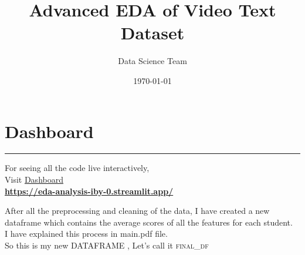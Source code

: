 \documentclass{article}
\title{\textcolor{primaryColor}{\Huge\textbf{Advanced EDA of Video Text Dataset}}}
\author{\textcolor{secondaryColor}{\Large Data Science Team}}
\date{\textcolor{secondaryColor}{\today}}
\begin{document}
\maketitle

\newpage
\section*{Dashboard}
  \begin{center}
        \color{red}\rule{1\linewidth}{1mm}
    \end{center}
\begin{center}
\vspace{2in}
    {\Huge  For seeing all the code live interactively, \\
    \vspace{2in}
    Visit  \href{https://eda-analysis-iby-0.streamlit.app/}{Dashboard}}\\
    
    \vspace{0.7in}
   \textbf{ \href{https://eda-analysis-iby-0.streamlit.app/}{https://eda-analysis-iby-0.streamlit.app/}}
\end{center}

\newpage
\tableofcontents

\newpage
\large

After all the preprocessing and cleaning of the data, I have created a new dataframe which contains the average scores of all the features for each student.\\
I have explained this process in main.pdf file.\\
So this is my new DATAFRAME , Let's call it \textsc{final\_df}
\end{document}
